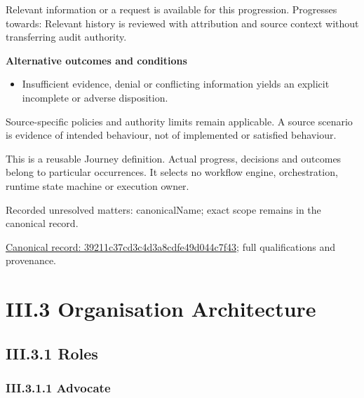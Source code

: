 Relevant information or a request is available for this progression. Progresses towards: Relevant history is reviewed with attribution and source context without transferring audit authority.



\par\medskip\textbf{Alternative outcomes and conditions}\par


\begin{itemize}


\item Insufficient evidence, denial or conflicting information yields an explicit incomplete or adverse disposition.

\end{itemize}


Source-specific policies and authority limits remain applicable. A source scenario is evidence of intended behaviour, not of implemented or satisfied behaviour.



This is a reusable Journey definition. Actual progress, decisions and outcomes belong to particular occurrences. It selects no workflow engine, orchestration, runtime state machine or execution owner.


{\small Recorded unresolved matters: canonicalName; exact scope remains in the canonical record.}\par
{\footnotesize \href{../../../../../../../continuum/strategy/value-stream/39211c37cd3c4d3a8cdfe49d044c7f43.md}{Canonical record: 39211c37cd3c4d3a8cdfe49d044c7f43}; full qualifications and provenance.}\par
\chapter*{III.3 Organisation Architecture}
\label{navigation:III.3}

\section*{III.3.1 Roles}
\label{navigation:III.3.1}

\subsection*{III.3.1.1 Advocate}
\label{navigation:III.3.1.1}

